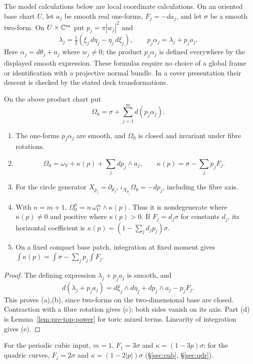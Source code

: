 The model calculations below are local coordinate calculations. On an oriented base chart $U$,
let $a_j$ be smooth real one-forms, $F_j=-da_j$, and let $\sigma$ be a smooth two-form.
On $U\times\mathbb{C}^m$ put $p_j=\pi|w_j|^2$ and
\[
 \lambda_j=\tfrac12(\xi_j\,d\eta_j-\eta_j\,d\xi_j),\qquad
 p_j\alpha_j=\lambda_j+p_ja_j.
\]
Here $\alpha_j=d\theta_j+a_j$ where $w_j\ne0$; the product $p_j\alpha_j$ is defined everywhere by
the displayed smooth expression. These formulas require no choice of a global frame or identification
with a projective normal bundle. In a cover presentation their descent is checked by the stated deck transformations.

\begin{lemma}\label{lem:pre-local-form}
On the above product chart put
\[
 \Omega_0=\sigma+\sum_{j=1}^md(p_j\alpha_j).
\]
\begin{enumerate}[label=(\alph*)]
\item The one-forms $p_j\alpha_j$ are smooth, and $\Omega_0$ is closed and invariant under fibre rotations.
\item
\[
 \Omega_0=\omega_V+\kappa(p)+\sum_jdp_j\wedge a_j,
 \qquad \kappa(p)=\sigma-\sum_jp_jF_j.
\]
\item For the circle generator $X_{p_j}=\partial_{\theta_j}$,
 $\iota_{X_{p_j}}\Omega_0=-dp_j$, including the fibre axis.
\item With $n=m+1$, $\Omega_0^n=n\,\omega_V^m\wedge\kappa(p)$.
 Thus it is nondegenerate where $\kappa(p)\ne0$ and positive where $\kappa(p)>0$.
 If $F_j=d_j\sigma$ for constants $d_j$, its horizontal coefficient is
 $\kappa(p)=(1-\sum_jd_jp_j)\sigma$.
\item On a fixed compact base patch, integration at fixed moment gives
 $\int\kappa(p)=\int\sigma-\sum_jp_j\int F_j$.
\end{enumerate}
\end{lemma}

\begin{proof}
The defining expression $\lambda_j+p_ja_j$ is smooth, and
\[
 d(\lambda_j+p_ja_j)=d\xi_j\wedge d\eta_j+dp_j\wedge a_j-p_jF_j.
\]
This proves (a),(b), since two-forms on the two-dimensional base are closed.
Contraction with a fibre rotation gives (c); both sides vanish on its axis.
Part (d) is Lemma~\ref{lem:pre-top-power} for toric mixed terms.
Linearity of integration gives (e).
\end{proof}

For the periodic cubic input, $m=1$, $F_1=3\sigma$ and $\kappa=(1-3p)\sigma$; for the quadric curves,
$F_j=2\sigma$ and $\kappa=(1-2|p|)\sigma$ (\S\ref{sec:cub}, \S\ref{sec:qdr}).

